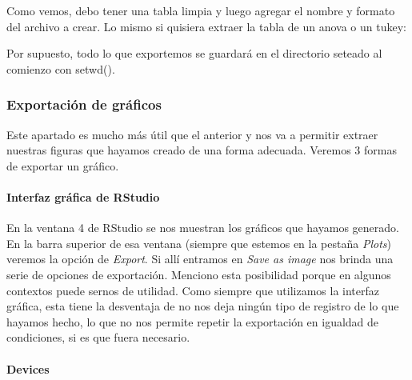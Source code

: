 \documentclass[
  letterpaper,
  DIV=11,
  numbers=noendperiod]{scrartcl}
\let\oldparagraph\paragraph
\renewcommand{\paragraph}[1]{\oldparagraph{#1}\mbox{}}
\newenvironment{Shaded}{\begin{snugshade}}{\end{snugshade}}
\newcommand{\FunctionTok}[1]{\textcolor[rgb]{0.28,0.35,0.67}{#1}}
\newcommand{\NormalTok}[1]{\textcolor[rgb]{0.00,0.23,0.31}{#1}}
\newcommand{\SpecialCharTok}[1]{\textcolor[rgb]{0.37,0.37,0.37}{#1}}
\newcommand{\StringTok}[1]{\textcolor[rgb]{0.13,0.47,0.30}{#1}}
\begin{document}
Como vemos, debo tener una tabla limpia y luego agregar el nombre y
formato del archivo a crear. Lo mismo si quisiera extraer la tabla de un
anova o un tukey:

\begin{Shaded}
\end{Shaded}

Por supuesto, todo lo que exportemos se guardará en el directorio
seteado al comienzo con setwd().

\hypertarget{exportaciuxf3n-de-gruxe1ficos}{%
\subsubsection{Exportación de
gráficos}\label{exportaciuxf3n-de-gruxe1ficos}}

Este apartado es mucho más útil que el anterior y nos va a permitir
extraer nuestras figuras que hayamos creado de una forma adecuada.
Veremos 3 formas de exportar un gráfico.

\hypertarget{interfaz-gruxe1fica-de-rstudio}{%
\paragraph{Interfaz gráfica de
RStudio}\label{interfaz-gruxe1fica-de-rstudio}}

En la ventana 4 de RStudio se nos muestran los gráficos que hayamos
generado. En la barra superior de esa ventana (siempre que estemos en la
pestaña \emph{Plots}) veremos la opción de \emph{Export}. Si allí
entramos en \emph{Save as image} nos brinda una serie de opciones de
exportación. Menciono esta posibilidad porque en algunos contextos puede
sernos de utilidad. Como siempre que utilizamos la interfaz gráfica,
esta tiene la desventaja de no nos deja ningún tipo de registro de lo
que hayamos hecho, lo que no nos permite repetir la exportación en
igualdad de condiciones, si es que fuera necesario.

\hypertarget{devices}{%
\paragraph{Devices}\label{devices}}
\end{document}
